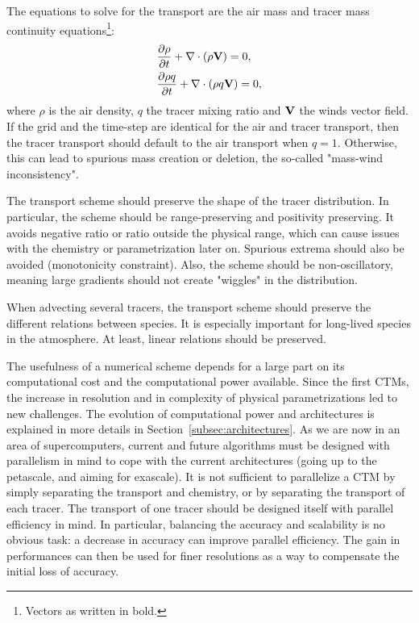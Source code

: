 The equations to solve for the transport are the air mass and tracer mass
continuity equations\footnote{Vectors as written in bold.}:
\begin{align}
  &\frac{\partial \rho}{\partial t} + \nabla \cdot (\rho {\bf V}) = 0 ,
  \label{eqn:air}
  \\
  &\frac{\partial \rho q}{\partial t} + \nabla \cdot ( \rho q {\bf V})  = 0,
  \label{eqn:tracer}
\end{align}
where $\rho$ is the air density, $q$ the tracer mixing ratio and ${\bf V}$ the
winds vector field. If the grid and the time-step are identical for the air and
tracer transport, then the tracer transport should default to the air transport
when $q=1$. Otherwise, this can lead to spurious mass creation or
deletion, the so-called "mass-wind inconsistency". 

The transport scheme should preserve the shape of the tracer distribution. In
particular, the scheme should be range-preserving and positivity preserving. It
avoids negative ratio or ratio outside the physical range, which can cause
issues with the chemistry or parametrization later on. Spurious extrema should
also be avoided (monotonicity constraint). Also, the scheme
should be non-oscillatory, meaning large gradients should not create "wiggles"
in the distribution.

When advecting several tracers, the transport scheme should preserve the
different relations between species. It is especially important for long-lived
species in the atmosphere. At least, linear relations should be
preserved.

The usefulness of a numerical scheme depends for a large part on its
computational cost and the computational power available.  Since the first
\gls{CTM}s, the increase in resolution and in complexity of physical
parametrizations led to new challenges. The evolution of computational power and
architectures is explained in more details in
Section~\ref{subsec:architectures}. As we are now in an area of supercomputers,
current and future algorithms must be designed with parallelism in mind to cope
with the current architectures (going up to the petascale, and aiming for
exascale). It is not sufficient to parallelize a CTM by simply separating the
transport and chemistry, or by separating the transport of each tracer. The
transport of one tracer should be designed itself with parallel efficiency in
mind. In particular, balancing the accuracy and scalability is no obvious task:
a decrease in accuracy can improve parallel efficiency. The gain in performances
can then be used for finer resolutions as a way to compensate the initial loss of accuracy.

